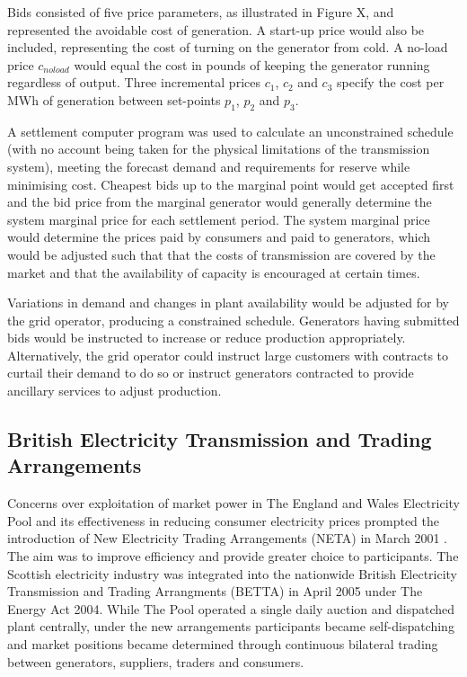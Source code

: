 
Bids consisted of five price parameters, as illustrated in Figure X, and
represented the avoidable cost of generation.  A start-up price would also be
included, representing the cost of turning on the generator from cold.  A
no-load price $c_{noload}$ would equal the cost in pounds of keeping the
generator running regardless of output. Three incremental prices $c_1$, $c_2$
and $c_3$ specify the cost per MWh of generation between set-points $p_1$,
$p_2$ and $p_3$.

A settlement computer program was used to calculate an unconstrained schedule
(with no account being taken for the physical limitations of the transmission
system), meeting the forecast demand and requirements for reserve while minimising cost.
Cheapest bids up to the marginal point would get accepted first and the bid
price from the marginal generator would generally determine the system marginal
price for each settlement period.  The system marginal price would determine
the prices paid by consumers and paid to generators, which would be adjusted
such that that the costs of transmission are covered by the market and that the
availability of capacity is encouraged at certain times.

Variations in demand and changes in plant availability would be adjusted for by
the grid operator, producing a constrained schedule.  Generators having
submitted bids would be instructed to increase or reduce production
appropriately.  Alternatively, the grid operator could instruct large customers
with contracts to curtail their demand to do so or instruct generators
contracted to provide ancillary services to adjust production.

\subsection{British Electricity Transmission and Trading Arrangements}
\label{sec:betta}
Concerns over exploitation of market power in The England and Wales Electricity
Pool and its effectiveness in reducing consumer electricity prices prompted the
introduction of New Electricity Trading Arrangements (NETA) in March 2001
\cite{martoccia:2005}.  The aim was to improve efficiency and provide greater
choice to participants.  The Scottish electricity industry was integrated into
the nationwide British Electricity Transmission and Trading Arrangments
(BETTA) in April 2005 under The Energy Act 2004.  While The Pool operated a
single daily auction and dispatched plant centrally, under the new
arrangements participants became self-dispatching and market positions became
determined through continuous bilateral trading between generators, suppliers,
traders and consumers.

